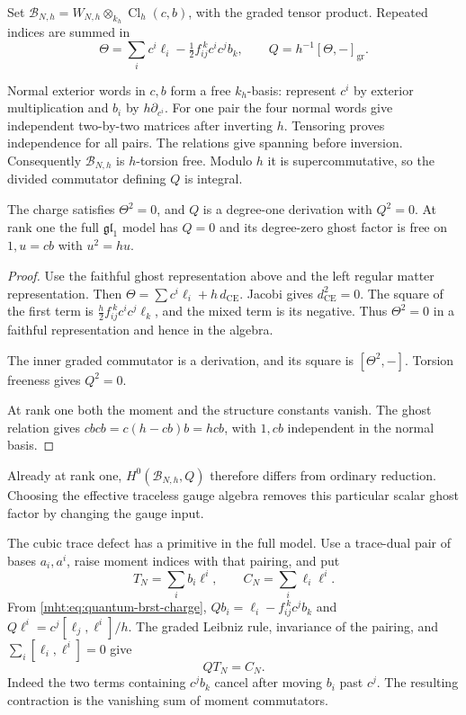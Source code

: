 Set $\mathcal B_{N,h}=W_{N,h}\otimes_{k_h}\operatorname{Cl}_h(c,b)$,
with the graded tensor product. Repeated indices are summed in
\begin{equation}\label{mht:eq:quantum-brst-charge}
 \Theta=\sum_i c^i\ell_i-\tfrac12f_{ij}^{\ k}c^ic^jb_k,
 \qquad Q=h^{-1}[\Theta,-]_{\mathrm{gr}}.
\end{equation}

Normal exterior words in $c,b$ form a free $k_h$-basis:
represent $c^i$ by exterior multiplication and $b_i$ by
$h\partial_{c^i}$. For one pair the four normal words give
independent two-by-two matrices after inverting $h$.
Tensoring proves independence for all pairs.
The relations give spanning before inversion. Consequently
$\mathcal B_{N,h}$ is $h$-torsion free. Modulo $h$ it is
supercommutative, so the divided commutator defining $Q$
is integral.

\begin{proposition}\label{mht:prop:quantum-brst}
The charge satisfies $\Theta^2=0$, and $Q$ is a
degree-one derivation with $Q^2=0$. At rank one the full
$\mathfrak{gl}_1$ model has $Q=0$ and its degree-zero ghost
factor is free on $1,u=cb$ with $u^2=hu$.
\end{proposition}
\begin{proof}
Use the faithful ghost representation above and the left regular
matter representation. Then
$\Theta=\sum c^i\ell_i+h\,d_{\mathrm{CE}}$.
Jacobi gives $d_{\mathrm{CE}}^2=0$. The square of the first
term is $\frac h2f_{ij}^{\ k}c^ic^j\ell_k$, and the mixed
term is its negative. Thus $\Theta^2=0$ in a faithful
representation and hence in the algebra.

The inner graded commutator is a derivation, and its square is
$[\Theta^2,-]$. Torsion freeness gives $Q^2=0$.

At rank one both the moment and the structure constants vanish.
The ghost relation gives
$cbcb=c(h-cb)b=hcb$, with $1,cb$ independent in the normal basis.
\end{proof}

Already at rank one, $H^0(\mathcal B_{N,h},Q)$ therefore
differs from ordinary reduction. Choosing the effective
traceless gauge algebra removes this particular scalar ghost
factor by changing the gauge input.

The cubic trace defect has a primitive in the full model.
Use a trace-dual pair of bases $a_i,a^i$, raise moment indices
with that pairing, and put
\[
 T_N=\sum_i b_i\ell^i,\qquad C_N=\sum_i\ell_i\ell^i.
\]
From \eqref{mht:eq:quantum-brst-charge},
$Qb_i=\ell_i-f_{ij}^{\ k}c^jb_k$ and
$Q\ell^i=c^j[\ell_j,\ell^i]/h$. The graded Leibniz rule,
invariance of the pairing, and
$\sum_i[\ell_i,\ell^i]=0$ give
\begin{equation}\label{mht:eq:casimir-primitive}
 QT_N=C_N.
\end{equation}
Indeed the two terms containing $c^jb_k$ cancel after moving
$b_i$ past $c^j$. The resulting contraction is the vanishing
sum of moment commutators.

